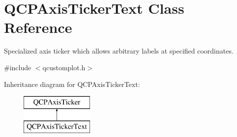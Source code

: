 \hypertarget{class_q_c_p_axis_ticker_text}{}\section{Q\+C\+P\+Axis\+Ticker\+Text Class Reference}
\label{class_q_c_p_axis_ticker_text}


Specialized axis ticker which allows arbitrary labels at specified coordinates.  




{\ttfamily \#include $<$qcustomplot.\+h$>$}

Inheritance diagram for Q\+C\+P\+Axis\+Ticker\+Text\+:\begin{figure}[H]
\begin{center}
\leavevmode
\includegraphics[height=2.000000cm]{df/db7/class_q_c_p_axis_ticker_text}
\end{center}
\end{figure}
